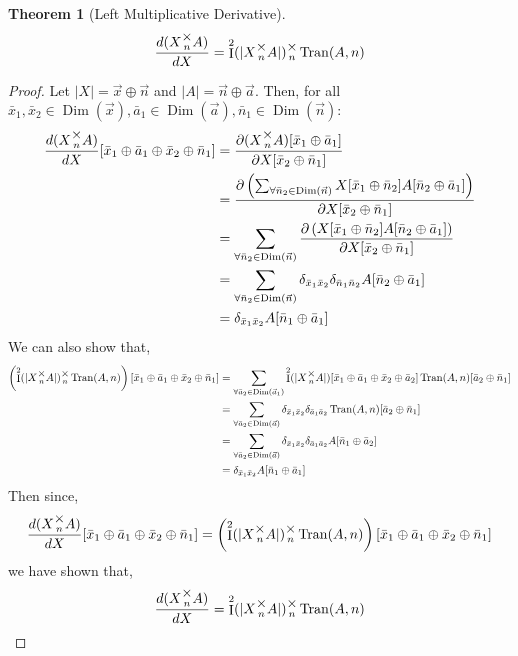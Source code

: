 \documentclass[12pt]{book}
\theoremstyle{definition}
\theoremstyle{plain}
\newtheorem{theorem}{Theorem}[chapter]
\theoremstyle{ppart}
\theoremstyle{case}
\theoremstyle{solution}
\DeclareMathOperator{\Dim}{Dim}
\DeclareMathOperator{\Ident}{I}
\DeclareMathOperator{\Tran}{Tran}
\newcommand{\mmult}[1]{\text{\raisebox{1ex}{$\underset{#1}{\times}$}}}
\begin{document}
\begin{landscape}
\begin{theorem}[Left Multiplicative Derivative]
\label{left_mult_derivative}
\[ \frac{d(X \mmult{n} A)}{dX} = \Ident^2(|X \mmult{n} A|) \mmult{n} \Tran(A, n) \]
\end{theorem}
\begin{proof}
Let $|X| = \vec{x} \oplus \vec{n}$ and $|A| = \vec{n} \oplus \vec{a}$. Then,
for all
$\bar{x}_1, \bar{x}_2 \in \Dim(\vec{x}), \bar{a}_1 \in \Dim(\vec{a}),
\bar{n}_1 \in \Dim(\vec{n}):$
\begin{align*}
	\frac{d(X \mmult{n} A)}{dX}
	[\bar{x}_1 \oplus \bar{a}_1 \oplus \bar{x}_2 \oplus \bar{n}_1]
	&= 
	\frac{
		\partial (X \mmult{n} A) [\bar{x}_1 \oplus \bar{a}_1]
	}{\partial X[\bar{x}_2 \oplus \bar{n}_1]} \\
	&= 
	\frac{
		\partial \left(
			\sum_{\forall \bar{n}_2 \in \Dim(\vec{n})}
			X[\bar{x}_1 \oplus \bar{n}_2] A[\bar{n}_2 \oplus \bar{a}_1]
		\right)
	}{\partial X[\bar{x}_2 \oplus \bar{n}_1]} \\
	&= 
	\sum_{\forall \bar{n}_2 \in \Dim(\vec{n})}
	\frac{
		\partial \left(
			X[\bar{x}_1 \oplus \bar{n}_2] A[\bar{n}_2 \oplus \bar{a}_1]
		\right)
	}{\partial X[\bar{x}_2 \oplus \bar{n}_1]} \\
	&= 
	\sum_{\forall \bar{n}_2 \in \Dim(\vec{n})}
	\delta_{\bar{x}_1\bar{x}_2}
	\delta_{\bar{n}_1\bar{n}_2}
	A[\bar{n}_2 \oplus \bar{a}_1] \\
	&= 
	\delta_{\bar{x}_1\bar{x}_2}
	A[\bar{n}_1 \oplus \bar{a}_1]
\end{align*}
We can also show that,
\begin{align*}
	\left(\Ident^2(|X \mmult{n} A|) \mmult{n} \Tran(A, n)\right)
	[\bar{x}_1 \oplus \bar{a}_1 \oplus \bar{x}_2 \oplus \bar{n}_1]
	&=
	\sum_{\forall \bar{a}_2 \in \Dim(\vec{a}_1)}
	\Ident^2(|X \mmult{n} A|)[\bar{x}_1 \oplus \bar{a}_1 \oplus \bar{x}_2 \oplus \bar{a}_2]
	\Tran(A, n)[\bar{a}_2 \oplus \bar{n}_1] \\
	&=
	\sum_{\forall \bar{a}_2 \in \Dim(\vec{a})}
	\delta_{\bar{x}_1 \bar{x}_2} \delta_{\bar{a}_1 \bar{a}_2}
	\Tran(A, n)[\bar{a}_2 \oplus \bar{n}_1] \\
	&=
	\sum_{\forall \bar{a}_2 \in \Dim(\vec{a})}
	\delta_{\bar{x}_1 \bar{x}_2} \delta_{\bar{a}_1 \bar{a}_2}
	A[\bar{n}_1 \oplus \bar{a}_2] \\
	&=
	\delta_{\bar{x}_1 \bar{x}_2}
	A[\bar{n}_1 \oplus \bar{a}_1]
\end{align*}
Then since,
\[
	\frac{d(X \mmult{n} A)}{dX}
	[\bar{x}_1 \oplus \bar{a}_1 \oplus \bar{x}_2 \oplus \bar{n}_1]
	=
	\left(\Ident^2(|X \mmult{n} A|) \mmult{n} \Tran(A, n)\right)
	[\bar{x}_1 \oplus \bar{a}_1 \oplus \bar{x}_2 \oplus \bar{n}_1]
\]
we have shown that,
\[
	\frac{d(X \mmult{n} A)}{dX}
	=
	\Ident^2(|X \mmult{n} A|) \mmult{n} \Tran(A, n)
\]
\end{proof}
\end{landscape}
\end{document}
